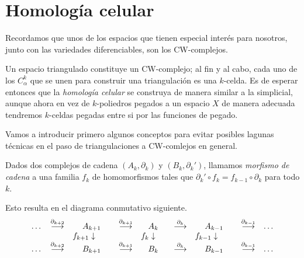 \section{Homología celular}
\label{subsec:homcelular}
 Recordamos que unos de los espacios que tienen especial interés para nosotros, junto con las variedades diferenciables, son los CW-complejos. 
 

 Un espacio triangulado constituye un CW-complejo; al fin y al cabo, cada uno de los $C^k_{\alpha}$ que se unen para construir una triangulación es una $k$-celda. Es de esperar entonces que la \textit{homología celular} se construya de manera similar a la simplicial, aunque ahora en vez de $k$-poliedros pegados a un espacio $X$ de manera adecuada tendremos $k$-celdas pegadas entre si por las funciones de pegado.
 
Vamos a introducir primero algunos conceptos para evitar posibles lagunas técnicas en el paso de triangulaciones a CW-comlejos en general.

 \begin{definition}
    Dados dos complejos de cadena $(A_k, \partial_k)$ y $(B_k, \partial_k')$, llamamos \textit{morfismo de cadena} a una familia $f_k$ de homomorfismos tales que $\partial_k'\circ f_k = f_{k-1}\circ \partial_k$ para todo $k$.
 \end{definition}

 Esto resulta en el diagrama conmutativo siguiente.
 \[
 \begin{array}{ccccccccc}
    \dots & \overset{\partial_{k+2}}{\longrightarrow} & A_{k+1} & \overset{\partial_{k+1}}{\longrightarrow} & A_{k} & \overset{\partial_{k}}{\longrightarrow} & A_{k-1} & \overset{\partial_{k-1}}{\longrightarrow} & \dots \\
    & & f_{k+1} \huge\downarrow  ~~~ & & f_k \huge\downarrow ~~ & & f_{k-1} \huge\downarrow ~~~ & & \\
    \dots & \overset{\partial_{k+2}}{\longrightarrow} & B_{k+1} & \overset{\partial_{k+1}}{\longrightarrow} & B_{k} & \overset{\partial_{k}}{\longrightarrow} & B_{k-1} & \overset{\partial_{k-1}}{\longrightarrow} & \dots
 \end{array}
\]

